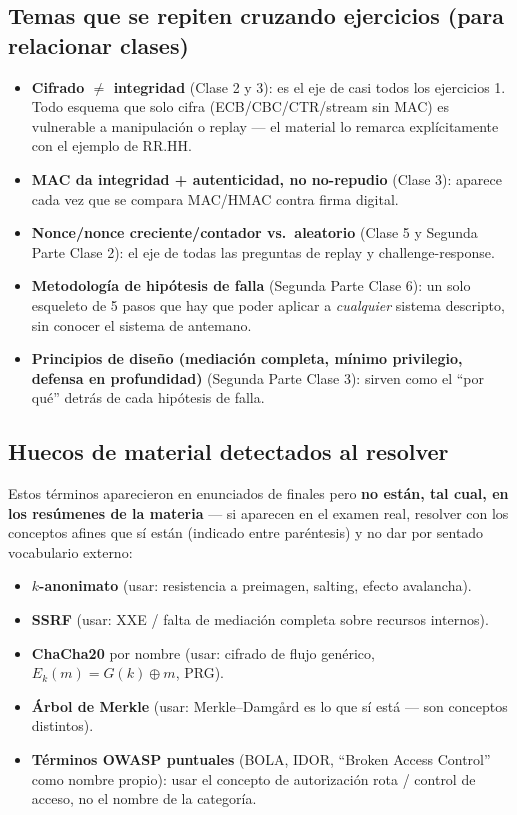\subsection{Temas que se repiten cruzando ejercicios (para relacionar clases)}
\begin{itemize}
  \item \textbf{Cifrado $\neq$ integridad} (Clase 2 y 3): es el eje de casi todos los
  ejercicios 1. Todo esquema que solo cifra (ECB/CBC/CTR/stream sin MAC) es vulnerable a
  manipulación o replay --- el material lo remarca explícitamente con el ejemplo de RR.HH.
  \item \textbf{MAC da integridad + autenticidad, no no-repudio} (Clase 3): aparece cada
  vez que se compara MAC/HMAC contra firma digital.
  \item \textbf{Nonce/nonce creciente/contador vs.\ aleatorio} (Clase 5 y Segunda Parte
  Clase 2): el eje de todas las preguntas de replay y challenge-response.
  \item \textbf{Metodología de hipótesis de falla} (Segunda Parte Clase 6): un solo
  esqueleto de 5 pasos que hay que poder aplicar a \emph{cualquier} sistema descripto, sin
  conocer el sistema de antemano.
  \item \textbf{Principios de diseño (mediación completa, mínimo privilegio, defensa en
  profundidad)} (Segunda Parte Clase 3): sirven como el ``por qué'' detrás de cada
  hipótesis de falla.
\end{itemize}

\subsection{Huecos de material detectados al resolver}
\begin{ojo}
Estos términos aparecieron en enunciados de finales pero \textbf{no están, tal cual, en
los resúmenes de la materia} --- si aparecen en el examen real, resolver con los conceptos
afines que sí están (indicado entre paréntesis) y no dar por sentado vocabulario externo:
\begin{itemize}
  \item \textbf{$k$-anonimato} (usar: resistencia a preimagen, salting, efecto avalancha).
  \item \textbf{SSRF} (usar: XXE / falta de mediación completa sobre recursos internos).
  \item \textbf{ChaCha20} por nombre (usar: cifrado de flujo genérico, $E_k(m)=G(k)\oplus m$,
  PRG).
  \item \textbf{Árbol de Merkle} (usar: Merkle--Damgård es lo que sí está --- son conceptos
  distintos).
  \item \textbf{Términos OWASP puntuales} (BOLA, IDOR, ``Broken Access Control'' como
  nombre propio): usar el concepto de autorización rota / control de acceso, no el nombre
  de la categoría.
\end{itemize}
\end{ojo}

